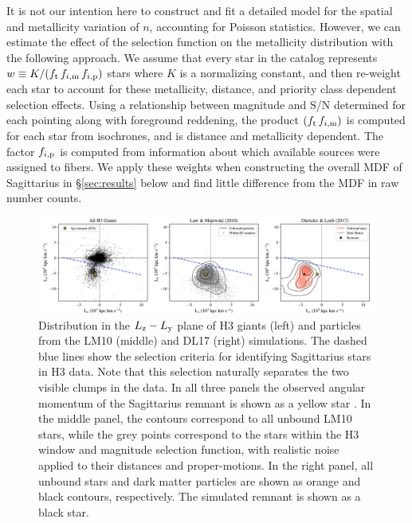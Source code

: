 \documentclass[twocolumn,tighten,twocolappendix]{aastex63}
\newcommand{\sgr}{Sagittarius}
\newcommand{\Ly}{L_{\rm y}}
\newcommand{\Lz}{L_{\rm z}}
\begin{document}
\begin{CJK*}{UTF8}{gbsn}
It is not our intention here to construct and fit a detailed model for the spatial and metallicity variation of $n$, accounting for Poisson statistics. However, we can estimate the effect of the selection function on the metallicity distribution with the following approach.  We assume that every star in the catalog represents $w \equiv K / (f_{\rm t} \, f_{i, {\rm m}} \, f_{i, {\rm p}})$ stars where $K$ is a normalizing constant, and then re-weight each star to account for these metallicity, distance, and priority class dependent selection effects.   Using a relationship between magnitude and S/N determined for each pointing along with foreground reddening, the product $(f_{\rm t} \, f_{i, {\rm m}})$ is computed for each star from isochrones, and is distance and metallicity dependent.  The factor $f_{i, {\rm p}}$ is computed from information about which available sources were assigned to fibers.  We apply these weights when constructing the overall MDF of \sgr{} in \S\ref{sec:results} below and find little difference from the MDF in raw number counts.


\begin{figure}
\includegraphics[width=\textwidth]{selection_lylz.pdf}
\caption{Distribution in the $\Lz-\Ly$ plane of H3 giants (left) and particles from the LM10 (middle) and DL17 (right) simulations. The dashed blue lines show the selection criteria for identifying \sgr{} stars in H3 data.  Note that this selection naturally separates the two visible clumps in the data. In all three panels the observed angular momentum of the \sgr{} remnant is shown as a yellow star \citep[][F18]{Fritz18}.  In the middle panel, the contours correspond to all unbound LM10 stars, while the grey points correspond to the stars within the H3 window and magnitude selection function, with realistic noise applied to their distances and proper-motions.  In the right panel, all unbound stars and dark matter particles are shown as orange and black contours, respectively.  The simulated remnant is shown as a black star.
\label{fig:lylz}}
\end{figure}


\end{CJK*}
\end{document}
